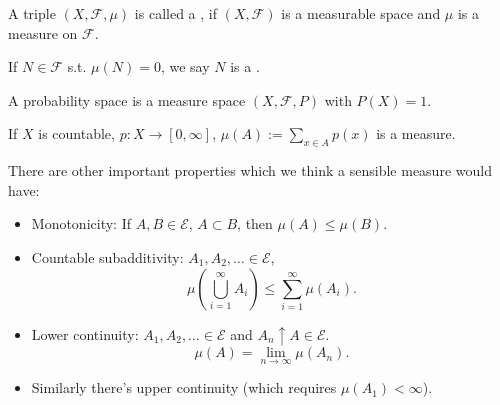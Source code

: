 \begin{definition}
	A triple $(X,\mathscr{F},\mu)$ is called a ,
	if $(X,\mathscr{F})$ is a measurable space and $\mu$ is a measure on $ \mathscr{F}$.
\end{definition}

If $N\in \mathscr{F}$ s.t. $\mu(N)=0$, we say  $N$ is a .

A probability space is a measure space $(X,\mathscr{F},P)$ with $P(X)=1$. 

\begin{example}
	If $X$ is countable,  $p:X\to [0,\infty]$, $\mu(A) := \sum_{x\in A} p(x)$
	is a measure.
\end{example}

There are other important properties which we think a sensible measure would have:
\begin{itemize}
	\item Monotonicity: If $A,B\in \mathscr{E}$, $A \subset B$, then $\mu(A)\le \mu(B)$. 

	\item Countable subadditivity: $A_1,A_2,\dots\in \mathscr{E}$,
	\[
	\mu \left( \bigcup_{i=1}^\infty A_i \right)\le \sum_{i=1}^{\infty} \mu(A_i).
	\]

	\item Lower continuity: $A_1,A_2,\dots\in \mathscr{E}$ and $A_n \uparrow A\in \mathscr{E}$.
	\[
	\mu(A) = \lim_{n\to \infty}\mu(A_n).
	\]

	\item Similarly there's upper continuity (which requires $\mu(A_1)<\infty$).
\end{itemize}

